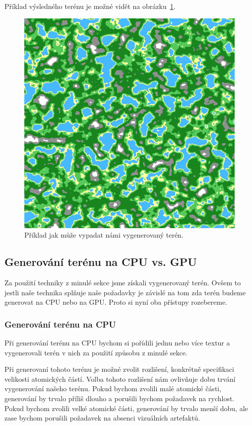 Příklad výsledného terénu je možné vidět na obrázku~\ref{fig:terrain}.

\begin{figure}[!htb]
    \centering
    \includegraphics[width=0.66\linewidth]{img/terrain.png}
    \caption{Příklad jak může vypadat námi vygenerovaný terén.}
    \label{fig:terrain}
\end{figure}


\subsection{Generování terénu na CPU vs. GPU}
Za použití techniky z minulé sekce jsme získali vygenerovaný terén. Ovšem to jestli naše technika splňuje naše požadavky je závislé na tom zda terén budeme generovat na CPU nebo na GPU. Proto si nyní oba přístupy rozebereme.

\subsubsection{Generování terénu na CPU}
Při generování terénu na CPU bychom si pořídili jednu nebo více textur a vygenerovali terén v nich za použití způsobu z minulé sekce.

Při generovaní tohoto terénu je možné zvolit rozlišení, konkrétně specifikaci velikosti atomických částí. Volba tohoto rozlišení nám ovlivňuje dobu trvání vygenerování našeho terénu. Pokud bychom zvolili malé atomické části, generování by trvalo příliš dlouho a porušili bychom požadavek na rychlost. Pokud bychom zvolili velké atomické části, generování by trvalo menší dobu, ale zase bychom porušili požadavek na absenci vizuálních artefaktů.

